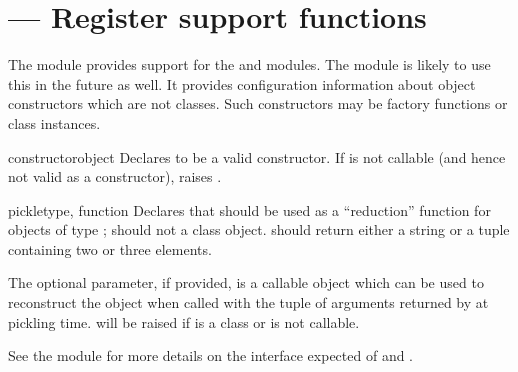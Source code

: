 \section{ ---
         Register  support functions}



The  module provides support for the
 and
 modules.  The
 module is likely to use this in the
future as well.  It provides configuration information about object
constructors which are not classes.  Such constructors may be factory
functions or class instances.


\begin{funcdesc}{constructor}{object}
  Declares  to be a valid constructor.  If  is
  not callable (and hence not valid as a constructor), raises
  .
\end{funcdesc}

\begin{funcdesc}{pickle}{type, function}
  Declares that  should be used as a ``reduction''
  function for objects of type ;  should not a
  class object.   should return either a string or a
  tuple containing two or three elements.

  The optional  parameter, if provided, is a
  callable object which can be used to reconstruct the object when
  called with the tuple of arguments returned by  at
  pickling time.   will be raised if
   is a class or  is not callable.

  See the  module for more
  details on the interface expected of  and
  .
\end{funcdesc}
